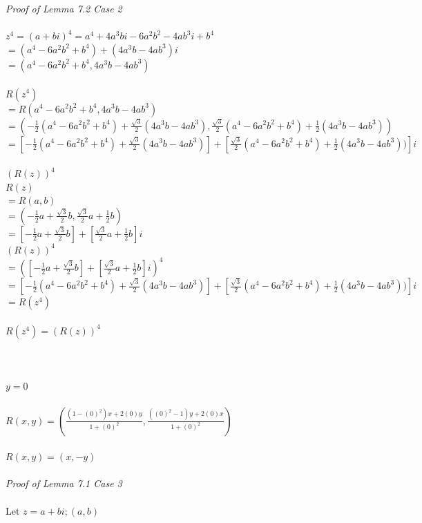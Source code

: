 \documentclass{article}
\begin{document}
\\
\\\textit{Proof of Lemma 7.2 Case 2}
\\
\\$z^4 = (a+bi)^4 = a^4+4a^3bi-6a^2b^2-4ab^3i+b^4$
\\$= (a^4-6a^2b^2+b^4) + (4a^3b-4ab^3)i$
\\$= (a^4-6a^2b^2+b^4, 4a^3b-4ab^3)$
\\
\\$R(z^4)$
\\$= R(a^4-6a^2b^2+b^4, 4a^3b-4ab^3)$
\\$= (-\frac{1}{2}(a^4-6a^2b^2+b^4)+\frac{\sqrt{3}}{2}(4a^3b-4ab^3), \frac{\sqrt{3}}{2}(a^4-6a^2b^2+b^4)+\frac{1}{2}(4a^3b-4ab^3))$
\\$= [-\frac{1}{2}(a^4-6a^2b^2+b^4)+\frac{\sqrt{3}}{2}(4a^3b-4ab^3)] + [\frac{\sqrt{3}}{2}(a^4-6a^2b^2+b^4)+\frac{1}{2}(4a^3b-4ab^3))]i$
\\
\\$(R(z))^4$
\\$R(z)$
\\$= R(a,b)$
\\$= (-\frac{1}{2}a+\frac{\sqrt{3}}{2}b, \frac{\sqrt{3}}{2}a+\frac{1}{2}b)$
\\$= [-\frac{1}{2}a+\frac{\sqrt{3}}{2}b] + [\frac{\sqrt{3}}{2}a+\frac{1}{2}b]i$
\\$(R(z))^4$
\\$= ([-\frac{1}{2}a+\frac{\sqrt{3}}{2}b] + [\frac{\sqrt{3}}{2}a+\frac{1}{2}b]i)^4$
\\$= [-\frac{1}{2}(a^4-6a^2b^2+b^4)+\frac{\sqrt{3}}{2}(4a^3b-4ab^3)] + [\frac{\sqrt{3}}{2}(a^4-6a^2b^2+b^4)+\frac{1}{2}(4a^3b-4ab^3))]i$
\\$= R(z^4)$
\\
\\$R(z^4) = (R(z))^4$
\\
\\
\\
\\
\underline{$y=0$}           %
\\
\\
$R(x,y) = (\frac{(1-(0)^2)x+2(0)y}{1+(0)^2}, \frac{((0)^2-1)y+2(0)x}{1+(0)^2})$
\\
\\$R(x,y) = (x,-y)$
\\
\\\textit{Proof of Lemma 7.1 Case 3}
\\
\\Let $z=a+bi; (a,b)$
\end{document}
